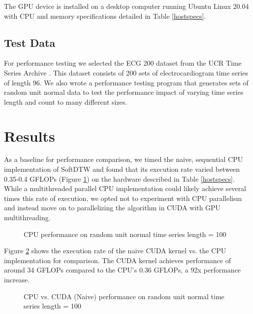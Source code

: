 \documentclass[12pt, letterpaper]{article}
\begin{document}
The GPU device is installed on a desktop computer running Ubuntu Linux 20.04
with CPU and memory specifications detailed in Table \ref{hostspecs}.

\subsection{Test Data}

For performance testing we selected the ECG 200 dataset from the UCR Time Series
Archive \cite{dau_ucr_2019}. This dataset consists of 200 sets of
electrocardiogram time series of length 96. We also wrote a performance testing
program that generates sets of random unit normal data to test the performance
impact of varying time series length and count to many different sizes.


\section{Results}
\FloatBarrier

As a baseline for performance comparison, we timed the naive, sequential CPU
implementation of SoftDTW and found that its execution rate varied between
0.35-0.4 GFLOPs (Figure \ref{plot_cpu}) on the hardware described in Table
\ref{hostspecs}. While a multithreaded parallel CPU implementation could likely
achieve several times this rate of execution, we opted not to experiment with
CPU parallelism and instead move on to parallelizing the algorithm in CUDA with
GPU multithreading.

\begin{figure}[htbp]
    \begin{center}
        \scalebox{0.85}{}
    \end{center}
    \caption{CPU performance on random unit normal time series length = 100}
    \label{plot_cpu}
\end{figure}

Figure \ref{plot_cpu_gpu} shows the execution rate of the naive CUDA kernel
vs. the CPU implementation for comparison. The CUDA kernel achieves performance
of around 34 GFLOPs compared to the CPU's 0.36 GFLOPs, a 92x performance
increase.

\begin{figure}[htbp]
    \begin{center}
        \scalebox{0.85}{}
    \end{center}
    \caption{CPU vs. CUDA (Naive) performance on random unit normal time series
      length = 100}
    \label{plot_cpu_gpu}
\end{figure}
\end{document}
